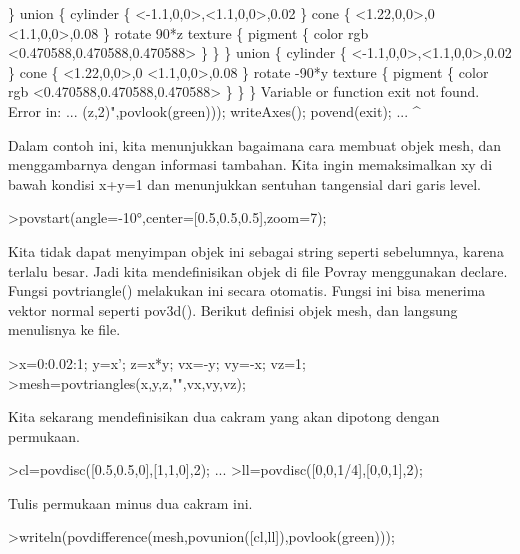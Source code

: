 \documentclass[a4paper,10pt]{article}
\begin{document}
\begin{eulernotebook}
\begin{eulercomment}
\begin{eulercomment}
\begin{euleroutput}
  \}
  union \{
    cylinder \{ <-1.1,0,0>,<1.1,0,0>,0.02 \}
    cone \{ 
      <1.22,0,0>,0
      <1.1,0,0>,0.08
    \}
    rotate 90*z
    texture \{ pigment \{ color rgb <0.470588,0.470588,0.470588> \} \}
  \}
  union \{
    cylinder \{ <-1.1,0,0>,<1.1,0,0>,0.02 \}
    cone \{ 
      <1.22,0,0>,0
      <1.1,0,0>,0.08
    \}
    rotate -90*y
    texture \{ pigment \{ color rgb <0.470588,0.470588,0.470588> \} \}
  \}
  Variable or function exit not found.
  Error in:
  ... (z,2)",povlook(green))); writeAxes(); povend(exit); ...
                                                       ^
\end{euleroutput}
\begin{eulercomment}
Dalam contoh ini, kita menunjukkan bagaimana cara membuat objek mesh,
dan menggambarnya dengan informasi tambahan. Kita ingin memaksimalkan
xy di bawah kondisi x+y=1 dan menunjukkan sentuhan tangensial dari
garis level.
\end{eulercomment}
\begin{eulerprompt}
>povstart(angle=-10°,center=[0.5,0.5,0.5],zoom=7);
\end{eulerprompt}
\begin{eulercomment}
Kita tidak dapat menyimpan objek ini sebagai string seperti
sebelumnya, karena terlalu besar. Jadi kita mendefinisikan objek di
file Povray menggunakan declare. Fungsi povtriangle() melakukan ini
secara otomatis. Fungsi ini bisa menerima vektor normal seperti
pov3d(). Berikut definisi objek mesh, dan langsung menulisnya ke file.
\end{eulercomment}
\begin{eulerprompt}
>x=0:0.02:1; y=x'; z=x*y; vx=-y; vy=-x; vz=1;
>mesh=povtriangles(x,y,z,"",vx,vy,vz);
\end{eulerprompt}
\begin{eulercomment}
Kita sekarang mendefinisikan dua cakram yang akan dipotong dengan
permukaan.
\end{eulercomment}
\begin{eulerprompt}
>cl=povdisc([0.5,0.5,0],[1,1,0],2); ...
>ll=povdisc([0,0,1/4],[0,0,1],2);
\end{eulerprompt}
\begin{eulercomment}
Tulis permukaan minus dua cakram ini.
\end{eulercomment}
\begin{eulerprompt}
>writeln(povdifference(mesh,povunion([cl,ll]),povlook(green)));
\end{eulerprompt}
\begin{eulercomment}

\end{eulercomment}
\end{eulercomment}
\end{eulercomment}
\end{eulernotebook}
\end{document}
